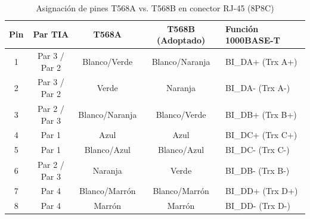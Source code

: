 \begin{table}[H]
\centering
\caption{Asignación de pines T568A vs. T568B en conector RJ-45 (8P8C)}
\small
\begin{tabularx}{\textwidth}{@{} c c c c X @{}}
\toprule
\textbf{Pin} & \textbf{Par TIA} & \textbf{T568A} & \textbf{T568B (Adoptado)} & \textbf{Función 1000BASE-T} \\
\midrule
1 & Par 3 / Par 2 & Blanco/Verde   & Blanco/Naranja & BI\_DA+ (Trx A+) \\
2 & Par 3 / Par 2 & Verde          & Naranja        & BI\_DA- (Trx A-) \\
3 & Par 2 / Par 3 & Blanco/Naranja & Blanco/Verde   & BI\_DB+ (Trx B+) \\
4 & Par 1         & Azul           & Azul           & BI\_DC+ (Trx C+) \\
5 & Par 1         & Blanco/Azul    & Blanco/Azul    & BI\_DC- (Trx C-) \\
6 & Par 2 / Par 3 & Naranja        & Verde          & BI\_DB- (Trx B-) \\
7 & Par 4         & Blanco/Marrón  & Blanco/Marrón  & BI\_DD+ (Trx D+) \\
8 & Par 4         & Marrón         & Marrón         & BI\_DD- (Trx D-) \\
\bottomrule
\end{tabularx}
\label{tab:t568b}
\end{table}

